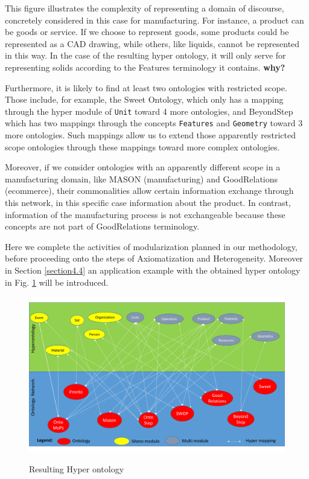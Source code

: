 This figure illustrates the complexity of representing a domain of discourse, concretely considered in this case for manufacturing. For instance, a product can be goods or  service. If we choose to represent goods, some products could be represented as a CAD drawing, while others, like liquids, cannot be represented in this way. In the case of the resulting hyper ontology, it will only serve for representing solids according to the Features terminology it contains. \textbf{why?}

Furthermore, it is likely to find at least two   ontologies with restricted scope. Those include, for example, the Sweet Ontology, which only has a mapping through the hyper module of \texttt{Unit} toward 4 more ontologies, and BeyondStep which has two mappings through the concepts \texttt{Features} and \texttt{Geometry} toward 3 more ontologies. Such mappings allow us to extend those apparently restricted scope  ontologies through these mappings toward more complex ontologies.

Moreover, if we consider ontologies with an apparently  different scope in a manufacturing domain, like MASON (manufacturing) and GoodRelations (ecommerce), their commonalities allow certain information exchange through this network, in this specific case information about the product. In contrast, information of the manufacturing process is not exchangeable because these concepts are not part of GoodRelations terminology. 

Here we complete the activities of modularization planned in our methodology, before proceeding onto the steps of Axiomatization and Heterogeneity. Moreover in Section \ref{section4.4} an application example with the obtained hyper ontology in Fig. \ref{figure4-28} will be introduced. 



\begin{figure}
\vspace{-10}
\begin{center}
	\includegraphics[scale=0.6, angle=90]{figure-chapterIV/fig4-28.pdf}\\
	\caption{Resulting Hyper ontology}
	\label{figure4-28}
\end{center}
\end{figure}



